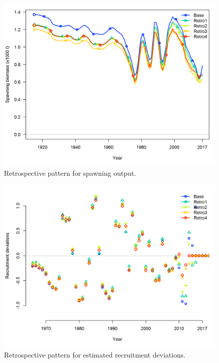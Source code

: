 \documentclass[12pt,]{article}
\begin{document}
\FloatBarrier

\FloatBarrier

\begin{figure}[htbp]
\centering
\includegraphics{Figures/retro_spawnb.png}
\caption{Retrospective pattern for spawning output.
\label{fig:retro_spawnb}}
\end{figure}

\FloatBarrier

\begin{figure}[htbp]
\centering
\includegraphics{Figures/retro_recdev.png}
\caption{Retrospective pattern for estimated recruitment deviations.
\label{fig:retro_recdev}}
\end{figure}
\end{document}
